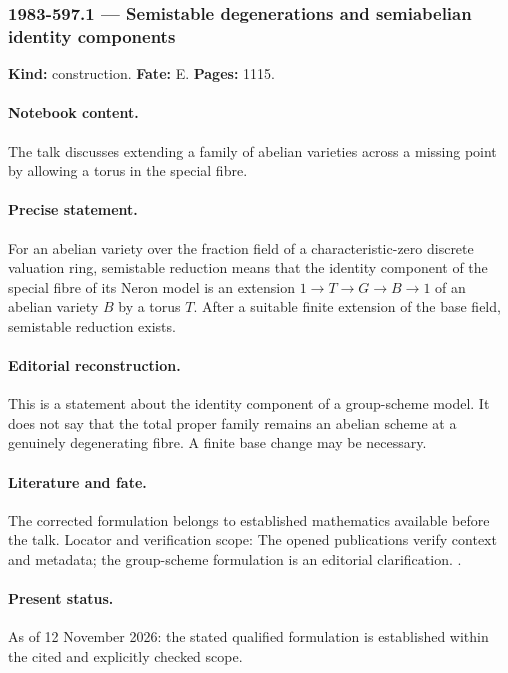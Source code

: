 \subsubsection{1983-597.1 --- Semistable degenerations and semiabelian identity components}

\label{item:1983-597.1}

\noindent\textbf{Kind:} construction. \textbf{Fate:} E. \textbf{Pages:} 1115.\par

\paragraph{Notebook content.} The talk discusses extending a family of abelian varieties across a missing point by allowing a torus in the special fibre.

\paragraph{Precise statement.} For an abelian variety over the fraction field of a characteristic-zero discrete valuation ring, semistable reduction means that the identity component of the special fibre of its Neron model is an extension \(1\to T\to G\to B\to1\) of an abelian variety \(B\) by a torus \(T\). After a suitable finite extension of the base field, semistable reduction exists.

\paragraph{Editorial reconstruction.} This is a statement about the identity component of a group-scheme model. It does not say that the total proper family remains an abelian scheme at a genuinely degenerating fibre. A finite base change may be necessary.

\paragraph{Literature and fate.} The corrected formulation belongs to established mathematics available before the talk. Locator and verification scope: The opened publications verify context and metadata; the group-scheme formulation is an editorial clarification. \cite{faltings1983arakelov,schmid1973variation}.

\paragraph{Present status.} As of 12 November 2026: the stated qualified formulation is established within the cited and explicitly checked scope.

